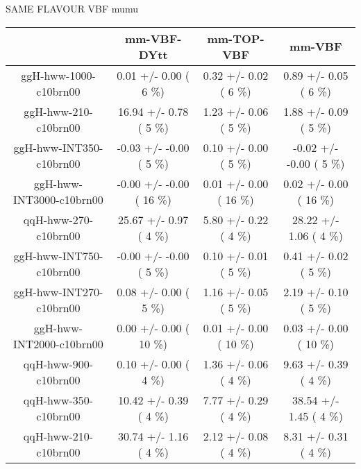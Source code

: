 \begin{table}[h!]\begin{center}
SAME FLAVOUR VBF mumu\\
\footnotesize{\begin{tabular}{
c| c | c | c | } \hline
  &   mm-VBF-DYtt  &    mm-TOP-VBF  &        mm-VBF  \\ \hline
 ggH-hww-1000-c10brn00   &       0.01 +/-       0.00 (         6 \%)   &       0.32 +/-       0.02 (         6 \%)   &       0.89 +/-       0.05 (         6 \%)  \\
 ggH-hww-210-c10brn00   &      16.94 +/-       0.78 (         5 \%)   &       1.23 +/-       0.06 (         5 \%)   &       1.88 +/-       0.09 (         5 \%)  \\
 ggH-hww-INT350-c10brn00   &      -0.03 +/-      -0.00 (         5 \%)   &       0.10 +/-       0.00 (         5 \%)   &      -0.02 +/-      -0.00 (         5 \%)  \\
 ggH-hww-INT3000-c10brn00   &      -0.00 +/-      -0.00 (        16 \%)   &       0.01 +/-       0.00 (        16 \%)   &       0.02 +/-       0.00 (        16 \%)  \\
 qqH-hww-270-c10brn00   &      25.67 +/-       0.97 (         4 \%)   &       5.80 +/-       0.22 (         4 \%)   &      28.22 +/-       1.06 (         4 \%)  \\
 ggH-hww-INT750-c10brn00   &      -0.00 +/-      -0.00 (         5 \%)   &       0.10 +/-       0.01 (         5 \%)   &       0.41 +/-       0.02 (         5 \%)  \\
 ggH-hww-INT270-c10brn00   &       0.08 +/-       0.00 (         5 \%)   &       1.16 +/-       0.05 (         5 \%)   &       2.19 +/-       0.10 (         5 \%)  \\
 ggH-hww-INT2000-c10brn00   &       0.00 +/-       0.00 (        10 \%)   &       0.01 +/-       0.00 (        10 \%)   &       0.03 +/-       0.00 (        10 \%)  \\
 qqH-hww-900-c10brn00   &       0.10 +/-       0.00 (         4 \%)   &       1.36 +/-       0.06 (         4 \%)   &       9.63 +/-       0.39 (         4 \%)  \\
 qqH-hww-350-c10brn00   &      10.42 +/-       0.39 (         4 \%)   &       7.77 +/-       0.29 (         4 \%)   &      38.54 +/-       1.45 (         4 \%)  \\
 qqH-hww-210-c10brn00   &      30.74 +/-       1.16 (         4 \%)   &       2.12 +/-       0.08 (         4 \%)   &       8.31 +/-       0.31 (         4 \%)  \\

\end{tabular}}
\end{center}
\end{table}
